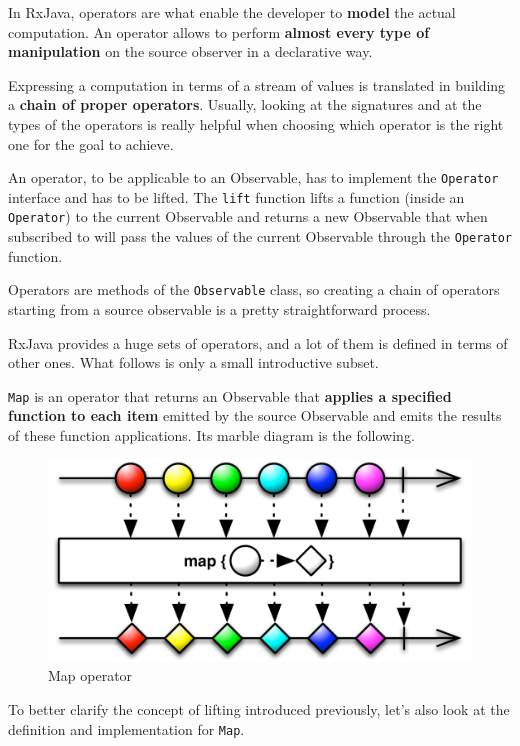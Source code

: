 In RxJava, operators are what enable the developer to \textbf{model} the
actual computation. An operator allows to perform \textbf{almost every
type of manipulation} on the source observer in a declarative way.

Expressing a computation in terms of a stream of values is translated in
building a \textbf{chain of proper operators}. Usually, looking at the
signatures and at the types of the operators is really helpful when
choosing which operator is the right one for the goal to achieve.

An operator, to be applicable to an Observable, has to implement the
\texttt{Operator} interface and has to be lifted. The \texttt{lift}
function lifts a function (inside an \texttt{Operator}) to the current
Observable and returns a new Observable that when subscribed to will
pass the values of the current Observable through the \texttt{Operator}
function.

Operators are methods of the \texttt{Observable} class, so creating a
chain of operators starting from a source observable is a pretty
straightforward process.

RxJava provides a huge sets of operators, and a lot of them is defined
in terms of other ones. What follows is only a small introductive
subset.

\label{map}

\texttt{Map} is an operator that returns an Observable that
\textbf{applies a specified function to each item} emitted by the source
Observable and emits the results of these function applications. Its
marble diagram is the following.

\begin{figure}[htbp]
\centering
\includegraphics[scale=0.5]{imgs/map.png}
\caption{Map operator}
\end{figure}

To better clarify the concept of lifting introduced previously, let's
also look at the definition and implementation for \texttt{Map}.

